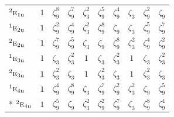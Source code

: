 \documentclass[10pt,a4paper]{article}
\numberwithin{equation}{section}
\newcommand{\irr}[1]{\text{\normalfont\scshape #1}}
\newcommand{\conjpair}[1]{{}^{#1}}
\newcommand{\ptag}[1]{\mathrm{#1}}
\newcommand{\rootunity}[1]{\zeta_{#1}}
\begin{document}
{\begin{longtable}{@{}lccccccccc@{}}
$\conjpair{2}\irr{e}_{1\ptag{u}}$ & $1$ & $\rootunity{9}^{8}$ & $\rootunity{9}^{7}$ & $\rootunity{3}^{2}$ & $\rootunity{9}^{5}$ & $\rootunity{9}^{4}$ & $\rootunity{3}$ & $\rootunity{9}^{2}$ & $\rootunity{9}$\\
$\conjpair{1}\irr{e}_{2\ptag{u}}$ & $1$ & $\rootunity{9}^{2}$ & $\rootunity{9}^{4}$ & $\rootunity{3}^{2}$ & $\rootunity{9}^{8}$ & $\rootunity{9}$ & $\rootunity{3}$ & $\rootunity{9}^{5}$ & $\rootunity{9}^{7}$\\
$\conjpair{2}\irr{e}_{2\ptag{u}}$ & $1$ & $\rootunity{9}^{7}$ & $\rootunity{9}^{5}$ & $\rootunity{3}$ & $\rootunity{9}$ & $\rootunity{9}^{8}$ & $\rootunity{3}^{2}$ & $\rootunity{9}^{4}$ & $\rootunity{9}^{2}$\\
$\conjpair{1}\irr{e}_{3\ptag{u}}$ & $1$ & $\rootunity{3}$ & $\rootunity{3}^{2}$ & $1$ & $\rootunity{3}$ & $\rootunity{3}^{2}$ & $1$ & $\rootunity{3}$ & $\rootunity{3}^{2}$\\
$\conjpair{2}\irr{e}_{3\ptag{u}}$ & $1$ & $\rootunity{3}^{2}$ & $\rootunity{3}$ & $1$ & $\rootunity{3}^{2}$ & $\rootunity{3}$ & $1$ & $\rootunity{3}^{2}$ & $\rootunity{3}$\\
$\conjpair{1}\irr{e}_{4\ptag{u}}$ & $1$ & $\rootunity{9}^{4}$ & $\rootunity{9}^{8}$ & $\rootunity{3}$ & $\rootunity{9}^{7}$ & $\rootunity{9}^{2}$ & $\rootunity{3}^{2}$ & $\rootunity{9}$ & $\rootunity{9}^{5}$\\*
$\conjpair{2}\irr{e}_{4\ptag{u}}$ & $1$ & $\rootunity{9}^{5}$ & $\rootunity{9}$ & $\rootunity{3}^{2}$ & $\rootunity{9}^{2}$ & $\rootunity{9}^{7}$ & $\rootunity{3}$ & $\rootunity{9}^{8}$ & $\rootunity{9}^{4}$\\
\bottomrule\end{longtable}}
\end{document}
